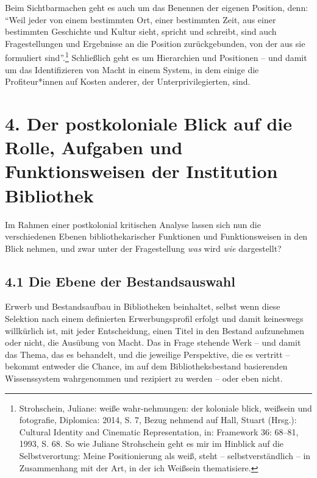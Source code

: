 \documentclass[a4paper,
fontsize=11pt,
oneside,
numbers=noperiodatend,
parskip=half-,
bibliography=totoc,
final
]{scrartcl}
\begin{document}
Beim Sichtbarmachen geht es auch um das Benennen der eigenen Position,
denn: \enquote{Weil jeder von einem bestimmten Ort, einer bestimmten Zeit, aus
einer bestimmten Geschichte und Kultur sieht, spricht und schreibt, sind
auch Fragestellungen und Ergebnisse an die Position zurückgebunden, von
der aus sie formuliert sind}.\footnote{Strohschein, Juliane: weiße
  wahr-nehmungen: der koloniale blick, weißsein und fotografie,
  Diplomica: 2014, S. 7, Bezug nehmend auf Hall, Stuart (Hrsg.):
  Cultural Identity and Cinematic Representation, in: Framework 36:
  68--81, 1993, S. 68. So wie Juliane Strohschein geht es mir im
  Hinblick auf die Selbstverortung: Meine Positionierung als weiß, steht
  -- selbstverständlich -- in Zusammenhang mit der Art, in der ich
  Weißsein thematisiere.} Schließlich geht es um Hierarchien und
Positionen -- und damit um das Identifizieren von Macht in einem System,
in dem einige die Profiteur*innen auf Kosten anderer, der
Unterprivilegierten, sind.

\hypertarget{der-postkoloniale-blick-auf-die-rolle-aufgaben-und-funktionsweisen-der-institution-bibliothek}{%
\section{4. Der postkoloniale Blick auf die Rolle, Aufgaben und
Funktionsweisen der Institution
Bibliothek}\label{der-postkoloniale-blick-auf-die-rolle-aufgaben-und-funktionsweisen-der-institution-bibliothek}}

Im Rahmen einer postkolonial kritischen Analyse lassen sich nun die
verschiedenen Ebenen bibliothekarischer Funktionen und Funktionsweisen
in den Blick nehmen, und zwar unter der Fragestellung \emph{was} wird
\emph{wie} dargestellt?

\hypertarget{die-ebene-der-bestandsauswahl}{%
\subsection{4.1 Die Ebene der
Bestandsauswahl}\label{die-ebene-der-bestandsauswahl}}

Erwerb und Bestandsaufbau in Bibliotheken beinhaltet, selbst wenn diese
Selektion nach einem definierten Erwerbungsprofil erfolgt und damit
keineswegs willkürlich ist, mit jeder Entscheidung, einen Titel in den
Bestand aufzunehmen oder nicht, die Ausübung von Macht. Das in Frage
stehende Werk -- und damit das Thema, das es behandelt, und die
jeweilige Perspektive, die es vertritt -- bekommt entweder die Chance,
im auf dem Bibliotheksbestand basierenden Wissenssystem wahrgenommen und
rezipiert zu werden -- oder eben nicht.
\end{document}
